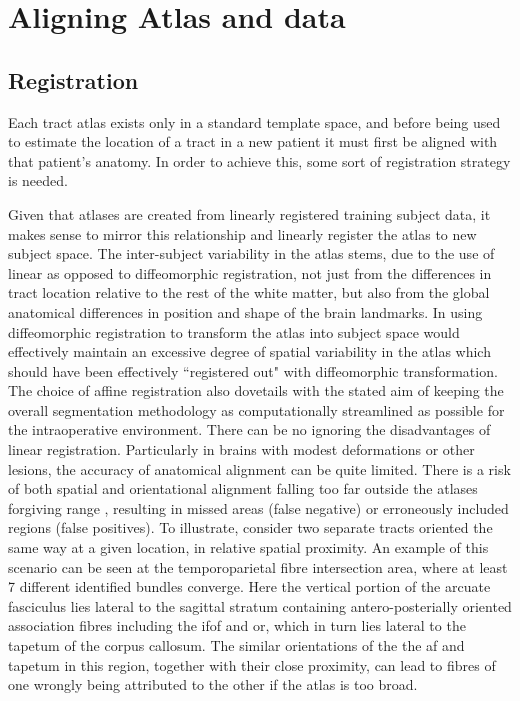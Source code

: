 \chapter{Aligning Atlas and data}


\section{Registration}


Each tract atlas exists only in a standard template space, and before being used to estimate the location of a tract in a new patient it must first be aligned with that patient's anatomy.
In order to achieve this, some sort of registration strategy is needed.

Given that atlases are created from linearly registered training subject data, it makes sense to mirror this relationship and linearly register the atlas to new subject space.
The inter-subject variability in the atlas stems, due to the use of linear as opposed to diffeomorphic registration, not just from the differences in tract location relative to the rest of the white matter, but also from the global anatomical differences in position and shape of the brain landmarks. 
In using diffeomorphic registration to transform the atlas into subject space would effectively maintain an excessive degree of spatial variability in the atlas which should have been effectively ``registered out" with diffeomorphic transformation.
The choice of affine registration also dovetails with the stated aim of keeping the overall segmentation methodology as computationally streamlined as possible for the intraoperative environment.
There can be no ignoring the disadvantages of linear registration.
Particularly in brains with modest deformations or other lesions, the accuracy of anatomical alignment can be quite limited.
There is a risk of both spatial and orientational alignment falling too far outside the atlases forgiving range , resulting in missed areas (false negative) or erroneously included regions (false positives).
To illustrate, consider two separate tracts oriented the same way at a given location, in relative spatial proximity.
An example of this scenario can be seen at the temporoparietal fibre intersection area, where at least 7 different  identified bundles converge.
Here the vertical portion of the arcuate fasciculus lies lateral to the sagittal stratum containing antero-posterially oriented association fibres including the \gls{ifof} and \gls{or}, which in turn lies lateral to the tapetum of the corpus callosum.
The similar orientations of the the \gls{af} and tapetum in this region, together with their close proximity, can lead to fibres of one wrongly being attributed to the other if the atlas is too broad.

